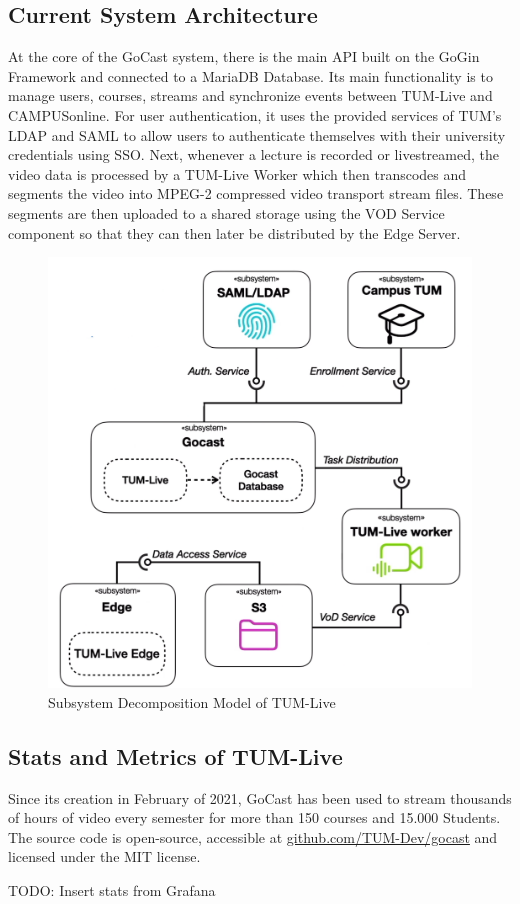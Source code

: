 \subsection{Current System Architecture}

At the core of the GoCast system, there is the main \ac{API} built on the GoGin Framework and connected to a MariaDB Database. Its main functionality is to manage users, courses, streams and synchronize events between TUM-Live and CAMPUSonline. For user authentication, it uses the provided services of \ac{TUM}'s \ac{LDAP} and \ac{SAML} to allow users to authenticate themselves with their university credentials using \ac{SSO}. 
Next, whenever a lecture is recorded or livestreamed, the video data is processed by a TUM-Live Worker which then transcodes and segments the video into MPEG-2 compressed video transport stream files. These segments are then uploaded to a shared storage using the VOD Service component so that they can then later be distributed by the Edge Server.

\begin{figure}[htpb]
    \centering
    \includegraphics[width=320pt]{images/OldDeploymentDiagram.png}
    \caption[Subsystem Decomposition]{Subsystem Decomposition Model of TUM-Live}\label{fig:old-system-architecture}
\end{figure}

\subsection{Stats and Metrics of TUM-Live}

Since its creation in February of 2021, GoCast has been used to stream thousands of hours of video every semester for more than 150 courses and 15.000 Students. The source code is open-source, accessible at \href{https://github.com/TUM-Dev/gocast}{github.com/TUM-Dev/gocast} and licensed under the MIT license.

TODO: Insert stats from Grafana